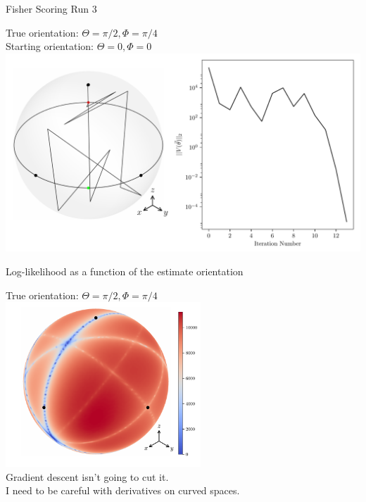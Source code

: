 \documentclass[presentation]{beamer}
\begin{document}
\begin{frame}[label=sec-5]{Fisher Scoring Run 3}
\begin{center}
True orientation: $\Theta = \pi/2, \Phi = \pi/4$\\
Starting orientation: $\Theta = 0, \Phi = 0$
  \includegraphics[width=1.0\textwidth, interpolate=true]{figs/recon-history3.pdf}
\end{center}
\end{frame}
\begin{frame}[label=sec-6]{Log-likelihood as a function of the estimate orientation}
  \begin{center}
  True orientation: $\Theta = \pi/2, \Phi = \pi/4$\\
    \includegraphics[width=0.55\textwidth, interpolate=true]{figs/likelihood.pdf}\\
Gradient descent isn't going to cut it.\\
I need to be careful with derivatives on curved spaces. 
  \end{center}
\end{frame}
\end{document}
